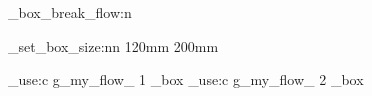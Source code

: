 \documentclass{article}
\begin{document}
\ExplSyntaxOn

\textbf{\thepage}

\my_box_break_flow:n { \textbf{\thepage} \lipsum[1] \par \textbf{\thepage} \lipsum[2] \textbf{\thepage} }

\my_set_box_size:nn { 120mm } { 200mm }

\lipsum[2]
\par

\box_use:c { g_my_flow_ 1 _box }
\box_use:c { g_my_flow_ 2 _box }

\par
\lipsum[1] 

\textbf{\thepage} 

\ExplSyntaxOff
\end{document}
